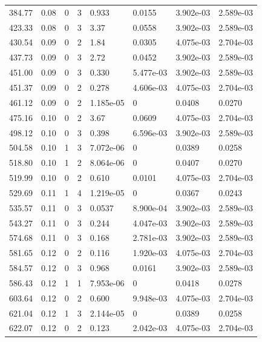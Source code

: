 \documentclass[preview]{standalone}
\begin{document}
{{{\begin{tabular}{L{1.2cm}C{1.2cm} C{0.3cm}C{0.5cm} C{1.4cm}C{1.4cm} C{1.4cm}C{1.4cm}}
  384.77  &  0.08  & 0     &  3 &  0.933  & 0.0155  & 3.902e-03 &  2.589e-03   \\ 
  423.33  &  0.08  & 0     &  3 &  3.37  & 0.0558  & 3.902e-03 &  2.589e-03   \\ 
  430.54  &  0.09  & 0     &  2 &  1.84  & 0.0305  & 4.075e-03 &  2.704e-03   \\ 
  437.73  &  0.09  & 0     &  3 &  2.72  & 0.0452  & 3.902e-03 &  2.589e-03   \\ 
  451.00  &  0.09  & 0     &  3 &  0.330  & 5.477e-03  & 3.902e-03 &  2.589e-03   \\ 
  451.37  &  0.09  & 0     &  2 &  0.278  & 4.606e-03  & 4.075e-03 &  2.704e-03   \\ 
  461.12  &  0.09  & 0     &  2 &  1.185e-05  & 0  & 0.0408 &  0.0270   \\ 
  475.16  &  0.10  & 0     &  2 &  3.67  & 0.0609  & 4.075e-03 &  2.704e-03   \\ 
  498.12  &  0.10  & 0     &  3 &  0.398  & 6.596e-03  & 3.902e-03 &  2.589e-03   \\ 
  504.58  &  0.10  & 1     &  3 &  7.072e-06  & 0  & 0.0389 &  0.0258   \\ 
  518.80  &  0.10  & 1     &  2 &  8.064e-06  & 0  & 0.0407 &  0.0270   \\ 
  519.99  &  0.10  & 0     &  2 &  0.610  & 0.0101  & 4.075e-03 &  2.704e-03   \\ 
  529.69  &  0.11  & 1     &  4 &  1.219e-05  & 0  & 0.0367 &  0.0243   \\ 
  535.57  &  0.11  & 0     &  3 &  0.0537  & 8.900e-04  & 3.902e-03 &  2.589e-03   \\ 
  543.27  &  0.11  & 0     &  3 &  0.244  & 4.047e-03  & 3.902e-03 &  2.589e-03   \\ 
  574.68  &  0.11  & 0     &  3 &  0.168  & 2.781e-03  & 3.902e-03 &  2.589e-03   \\ 
  581.65  &  0.12  & 0     &  2 &  0.116  & 1.920e-03  & 4.075e-03 &  2.704e-03   \\ 
  584.57  &  0.12  & 0     &  3 &  0.968  & 0.0161  & 3.902e-03 &  2.589e-03   \\ 
  586.43  &  0.12  & 1     &  1 &  7.953e-06  & 0  & 0.0418 &  0.0278   \\ 
  603.64  &  0.12  & 0     &  2 &  0.600  & 9.948e-03  & 4.075e-03 &  2.704e-03   \\ 
  621.04  &  0.12  & 1     &  3 &  2.144e-05  & 0  & 0.0389 &  0.0258   \\ 
  622.07  &  0.12  & 0     &  2 &  0.123  & 2.042e-03  & 4.075e-03 &  2.704e-03   \\ 

\end{tabular}}}}
\end{document}
